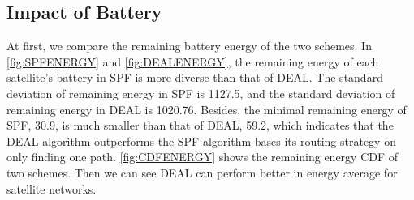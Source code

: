 \subsection{Impact of Battery}
At first, we compare the remaining battery energy of the two schemes. In \ref{fig:SPFENERGY} and  \ref{fig:DEALENERGY}, the remaining energy of each satellite's battery in SPF is more diverse than that of DEAL. The standard deviation of remaining energy in SPF is 1127.5, and the standard deviation of remaining energy in DEAL is 1020.76. Besides, the minimal remaining energy of SPF, 30.9,  is much smaller than that of DEAL, 59.2, which indicates that the DEAL algorithm outperforms the SPF algorithm bases its routing strategy on only finding one path.  \ref{fig:CDFENERGY} shows the remaining energy CDF of two schemes. Then we can see DEAL can perform better in energy average for satellite networks.

